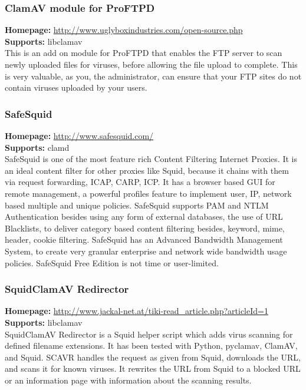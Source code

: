 \documentclass[a4paper,titlepage,12pt]{article}
\begin{document}
    \subsubsection{ClamAV module for ProFTPD}
    \textbf{Homepage:} \url{http://www.uglyboxindustries.com/open-source.php}\\
    \textbf{Supports:} libclamav\\[4pt]
    This is an add on module for ProFTPD that enables the FTP server to scan
    newly uploaded files for viruses, before allowing the file upload to
    complete. This is very valuable, as you, the administrator, can ensure
    that your FTP sites do not contain viruses uploaded by your users.

    \subsubsection{SafeSquid}
    \textbf{Homepage:} \url{http://www.safesquid.com/}\\
    \textbf{Supports:} clamd\\[4pt]
    SafeSquid is one of the most feature rich Content Filtering Internet
    Proxies. It is an ideal content filter for other proxies like Squid,
    because it chains with them via request forwarding, ICAP, CARP, ICP. It
    has a browser based GUI for remote management, a powerful profiles feature
    to implement user, IP, network based multiple and unique policies.
    SafeSquid supports PAM and NTLM Authentication besides using any form of
    external databases, the use of URL Blacklists, to deliver category based
    content filtering besides, keyword, mime, header, cookie filtering.
    SafeSquid has an Advanced Bandwidth Management System, to create very
    granular enterprise and network wide bandwidth usage policies. SafeSquid
    Free Edition is not time or user-limited.

    \subsubsection{SquidClamAV Redirector}
    \textbf{Homepage:} \url{http://www.jackal-net.at/tiki-read_article.php?articleId=1}\\
    \textbf{Supports:} libclamav\\[4pt]
    SquidClamAV Redirector is a Squid helper script which adds virus scanning
    for defined filename extensions. It has been tested with Python, pyclamav,
    ClamAV, and Squid. SCAVR handles the request as given from Squid, downloads
    the URL, and scans it for known viruses. It rewrites the URL from Squid to
    a blocked URL or an information page with information about the scanning
    results.
\end{document}
